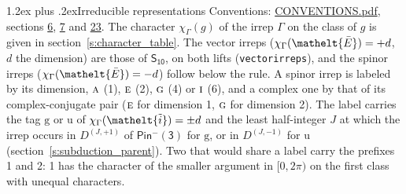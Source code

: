 \documentclass[10pt,a4paper]{article}
\makeatletter
\renewcommand\section{\@startsection{section}{1}{\z@}{-3ex plus -1ex minus -.2ex}%
  {1.2ex plus .2ex}{\normalfont\large\sffamily\bfseries\color{parttitle}}}
\numberwithin{equation}{section}
\newcommand{\eltfont}[1]{{\let\sigma\eltsigma\mathelt{#1}}}
\newcommand{\grp}[1]{\mathsf{#1}}
\newcommand{\irr}[1]{\text{\normalfont\scshape #1}}
\newcommand{\elt}[1]{\eltfont{#1}}
\newcommand{\ptag}[1]{\mathrm{#1}}
\newcommand{\irrJp}[2]{D^{(#1,#2)}}
\newcommand{\irchar}[1]{\chi_{#1}}
\newcommand{\barred}[1]{\bar{#1}}
\newcommand{\lift}[1]{\tilde{#1}}
\makeatother
\begin{document}
\section{Irreducible representations}\label{s:irreps}
Conventions: \href{../../CONVENTIONS.pdf}{CONVENTIONS.pdf}, sections \href{../../../rotation/CONVENTIONS.pdf\#conv.6}{6}, \href{../../../rotation/CONVENTIONS.pdf\#conv.7}{7} and \href{../../CONVENTIONS.pdf\#conv.23}{23}.
\leavevmode\label{n:function.character}\label{n:irrep.Gamma}The character $\irchar{\Gamma}(g)$ of the irrep $\Gamma$ on the class of $g$ is given in section~\ref{s:character_table}. \label{n:index.dimension}The vector irreps ($\irchar{\Gamma}(\elt{\barred{E}}) = +d$, $d$ the dimension) are those of \href{../../../rotation/data/pdf/S10.pdf}{$\grp{S_{10}}$}, on both lifts (\texttt{vectorirreps}), and the spinor irreps ($\irchar{\Gamma}(\elt{\barred{E}}) = -d$) follow below the rule. A spinor irrep is labeled by its dimension, $\irr{a}$ (1), $\irr{e}$ (2), $\irr{g}$ (4) or $\irr{i}$ (6), and a complex one by that of its complex-conjugate pair ($\irr{e}$ for dimension 1, $\irr{g}$ for dimension 2). The label carries the tag $\ptag{g}$ or $\ptag{u}$ of $\irchar{\Gamma}(\elt{\lift{i}}) = \pm d$ and the least half-integer $J$ at which the irrep occurs in $\irrJp{J}{+1}$ of $\grp{Pin^{-}(3)}$ for $\ptag{g}$, or in $\irrJp{J}{-1}$ for $\ptag{u}$ (section~\ref{s:subduction_parent}). Two that would share a label carry the prefixes 1 and 2: 1 has the character of the smaller argument in $[0, 2\pi)$ on the first class with unequal characters.
\end{document}
